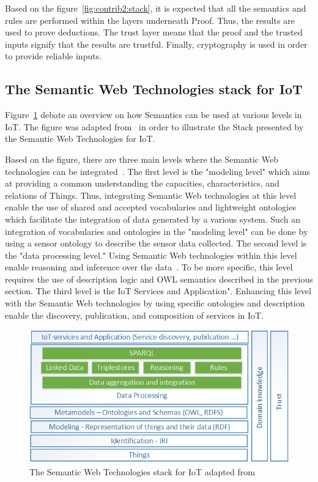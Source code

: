Based on the figure~\ref{fig:contrib2:stack}, it is expected that all the semantics and rules are performed within the layers underneath Proof. Thus, the results are used to prove deductions. The trust layer means that the proof and the trusted inputs signify that the results are trustful. Finally, cryptography is used in order to provide reliable inputs.

\subsection{The Semantic Web Technologies stack for IoT}
Figure~\ref{fig:contrib2:stack2} debate an overview on how Semantics can be used at various levels in IoT. The figure was adapted from ~\cite{stacksemantic2}in order to illustrate the Stack presented by the Semantic Web Technologies for IoT. \par 
Based on the figure, there are three main levels where the Semantic Web technologies can be integrated~\cite{stacksemantic1}. The first level is the "modeling level" which aims at providing a common understanding the capacities, characteristics, and relations of Things. Thus, integrating Semantic Web
technologies at this level enable the use of shared and accepted vocabularies and lightweight ontologies which facilitate the integration of data generated by a various system. Such an integration of vocabularies and ontologies in the "modeling level" can be done by using a sensor ontology to describe the sensor data collected. The second level is the "data processing level." Using Semantic Web technologies within this level enable reasoning and inference over the data~\cite{stacksemantic1}. To be more specific, this level requires the use of description logic and OWL semantics described in the previous section. The third level is the IoT Services and Application". Enhancing this level with the Semantic Web technologies by using specific ontologies and description enable the discovery, publication, and composition of services in IoT.
\begin{figure}[htbp]
    \centering
    \includegraphics[width=1\textwidth]{resources/images/stacksemantic}
    \caption{The Semantic Web Technologies stack for IoT adapted from~\cite{owlpic}}\label{fig:contrib2:stack2}
\end{figure}

